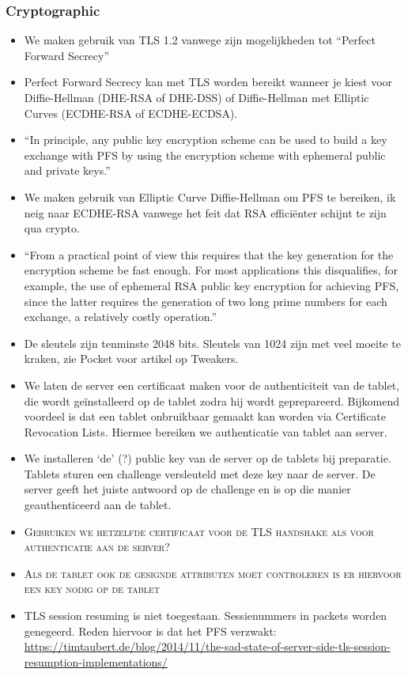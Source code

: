 \subsubsection{Cryptographic}
\begin{itemize}
  \item We maken gebruik van TLS 1.2 vanwege zijn mogelijkheden tot ``Perfect Forward Secrecy''
  \item Perfect Forward Secrecy kan met TLS worden bereikt wanneer je kiest voor Diffie-Hellman (DHE-RSA of DHE-DSS) of Diffie-Hellman met Elliptic Curves (ECDHE-RSA of ECDHE-ECDSA).
  \item ``In principle, any public key encryption scheme can be used to build a key exchange with PFS by using the encryption scheme with ephemeral public and private keys.''~\cite{PFS}
  \item We maken gebruik van Elliptic Curve Diffie-Hellman om PFS te bereiken, ik neig naar ECDHE-RSA vanwege het feit dat RSA efficiënter schijnt te zijn qua crypto.
  \item ``From a practical point of view this requires that the key generation for the encryption scheme be fast enough. For most applications this disqualifies, for example, the use of ephemeral RSA public key encryption for achieving PFS, since the latter requires the generation of two long prime numbers for each exchange, a relatively costly operation.''~\cite{PFS}
  \item De sleutels zijn tenminste 2048 bits. Sleutels van 1024 zijn met veel moeite te kraken, zie Pocket voor artikel op Tweakers.
  \item We laten de server een certificaat maken voor de authenticiteit van de tablet, die wordt geïnstalleerd op de tablet zodra hij wordt geprepareerd. Bijkomend voordeel is dat een tablet onbruikbaar gemaakt kan worden via Certificate Revocation Lists. Hiermee bereiken we authenticatie van tablet aan server.
  \item We installeren `de' (?) public key van de server op de tablets bij preparatie. Tablets sturen een challenge versleuteld met deze key naar de server. De server geeft het juiste antwoord op de challenge en is op die manier geauthenticeerd aan de tablet.
  \item \textsc{Gebruiken we hetzelfde certificaat voor de TLS handshake als voor authenticatie aan de server?}
  \item \textsc{Als de tablet ook de gesignde attributen moet controleren is er hiervoor een key nodig op de tablet}
  \item TLS session resuming is niet toegestaan. Sessienummers in packets worden genegeerd. Reden hiervoor is dat het PFS verzwakt: \url{https://timtaubert.de/blog/2014/11/the-sad-state-of-server-side-tls-session-resumption-implementations/  }

\end{itemize}
